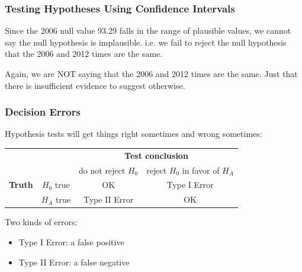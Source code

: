 \documentclass[handout]{beamer}
\newcommand{\blue}[1]{\textcolor{blue2}{#1}}
\begin{document}
\begin{frame}
\frametitle{Testing Hypotheses Using Confidence Intervals}

Since the 2006 \blue{null value} 93.29 falls in the range of plausible values, we cannot say the null hypothesis is implausible.  i.e. we fail to reject the null hypothesis that the 2006 and 2012 times are the same.  

\pause \vspace{0.25cm}

Again, we are NOT saying that the 2006 and 2012 times are the same.  Just that there is insufficient evidence to suggest otherwise.


\end{frame}


\begin{frame}
\frametitle{Decision Errors}
Hypothesis tests will get things right sometimes and wrong sometimes:
\pause \begin{center}
  \begin{tabular}{cc|cc}
     \multicolumn{2}{c}{}  & \multicolumn{2}{c}{\textbf{Test conclusion}} \\ 
     &  & do not reject $H_0$ & reject $H_0$ in favor of $H_A$ \\ 
\hline
    \textbf{Truth} & $H_0$ true & OK & \blue{Type I Error} \\ 
     & $H_A$ true & \blue{Type II Error} & OK \\ 
    \hline
  \end{tabular}
\end{center}

\vspace{0.25cm}

\pause Two kinds of errors:
\begin{itemize}
\pause \item \blue{Type I Error}: a false positive
\pause \item \blue{Type II Error}: a false negative
\end{itemize}

\end{frame}
\end{document}
